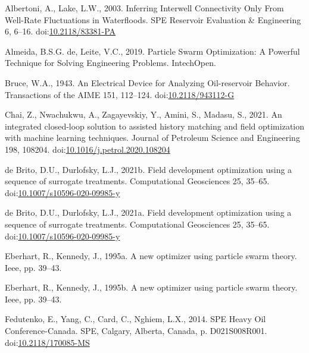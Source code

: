 \documentclass[]{elsarticle} %
\newlength{\cslhangindent}
\newenvironment{CSLReferences}[2] %
 {%
  \setlength{\parindent}{0pt}
  \ifodd #1 \everypar{\setlength{\hangindent}{\cslhangindent}}\ignorespaces\fi
  \ifnum #2 > 0
  \setlength{\parskip}{#2\baselineskip}
  \fi
 }%
 {}
\begin{document}
\hypertarget{refs}{}
\begin{CSLReferences}{1}{0}
\leavevmode{}%
Albertoni, A., Lake, L.W., 2003. Inferring Interwell Connectivity Only From Well-Rate Fluctuations in Waterfloods. SPE Reservoir Evaluation \& Engineering 6, 6--16. doi:\href{https://doi.org/10.2118/83381-PA}{10.2118/83381-PA}

\leavevmode{}%
Almeida, B.S.G. de, Leite, V.C., 2019. Particle Swarm Optimization: A Powerful Technique for Solving Engineering Problems. IntechOpen.

\leavevmode{}%
Bruce, W.A., 1943. An Electrical Device for Analyzing Oil-reservoir Behavior. Transactions of the AIME 151, 112--124. doi:\href{https://doi.org/10.2118/943112-G}{10.2118/943112-G}

\leavevmode{}%
Chai, Z., Nwachukwu, A., Zagayevskiy, Y., Amini, S., Madasu, S., 2021. An integrated closed-loop solution to assisted history matching and field optimization with machine learning techniques. Journal of Petroleum Science and Engineering 198, 108204. doi:\href{https://doi.org/10.1016/j.petrol.2020.108204}{10.1016/j.petrol.2020.108204}

\leavevmode{}%
de Brito, D.U., Durlofsky, L.J., 2021b. Field development optimization using a sequence of surrogate treatments. Computational Geosciences 25, 35--65. doi:\href{https://doi.org/10.1007/s10596-020-09985-y}{10.1007/s10596-020-09985-y}

\leavevmode{}%
de Brito, D.U., Durlofsky, L.J., 2021a. Field development optimization using a sequence of surrogate treatments. Computational Geosciences 25, 35--65. doi:\href{https://doi.org/10.1007/s10596-020-09985-y}{10.1007/s10596-020-09985-y}

\leavevmode{}%
Eberhart, R., Kennedy, J., 1995a. A new optimizer using particle swarm theory. Ieee, pp. 39--43.

\leavevmode{}%
Eberhart, R., Kennedy, J., 1995b. A new optimizer using particle swarm theory. Ieee, pp. 39--43.

\leavevmode{}%
Fedutenko, E., Yang, C., Card, C., Nghiem, L.X., 2014. SPE Heavy Oil Conference-Canada. SPE, Calgary, Alberta, Canada, p. D021S008R001. doi:\href{https://doi.org/10.2118/170085-MS}{10.2118/170085-MS}


\end{CSLReferences}
\end{document}
